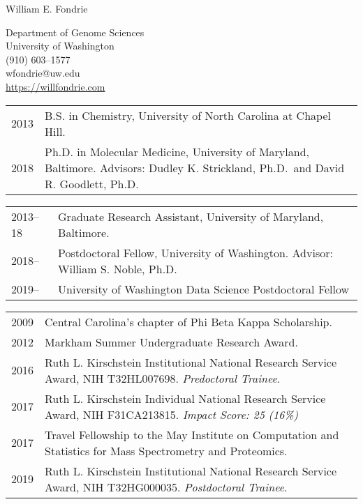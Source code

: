 \documentclass{article}
\newcommand{\mysection}[1]{\vspace{1ex}{\bf #1}}
\begin{document}
\begin{center}
  {\Large William E. Fondrie}

  Department of Genome Sciences\\
  University of Washington\\
  (910) 603--1577\\
  wfondrie@uw.edu \\
  \url{https://willfondrie.com}\\
\end{center}

\mysection{Education}

\begin{tabular}{p{0.5in}p{5.75in}}
  2013 & B.S. in Chemistry, University of North Carolina at Chapel Hill.\\
  2018 & Ph.D. in Molecular Medicine, University of Maryland, Baltimore.
         \newline Advisors: Dudley K. Strickland, Ph.D.\
         and David R. Goodlett, Ph.D.\\
\end{tabular}

\mysection{Employment and Professional Appointments}

\begin{tabular}{p{0.5in}p{5.75in}}
  2013--18 & Graduate Research Assistant, University of Maryland,
             Baltimore.\\
  2018--   & Postdoctoral Fellow, University of Washington.
             \newline Advisor: William S. Noble, Ph.D.\\
  2019--   & University of Washington Data Science Postdoctoral Fellow\\
\end{tabular}

\mysection{Awards and Honors}

\begin{tabular}{p{0.5in}p{5.75in}}
  2009 & Central Carolina's chapter of Phi Beta Kappa Scholarship.\\
  2012 & Markham Summer Undergraduate Research Award.\\
  2016 & Ruth L. Kirschstein Institutional National Research Service Award,
         NIH T32HL007698.
         \newline \textit{Predoctoral Trainee}.\\
  2017 & Ruth L. Kirschstein Individual National Research Service Award,
         NIH F31CA213815.
         \newline \textit{Impact Score: 25 (16\%)}\\
  2017 & Travel Fellowship to the May Institute on Computation and Statistics
         for Mass Spectrometry and Proteomics.\\
  2019 & Ruth L. Kirschstein Institutional National Research Service Award,
         NIH T32HG000035.
         \newline \textit{Postdoctoral Trainee}.\\
	
\end{tabular}
\end{document}
